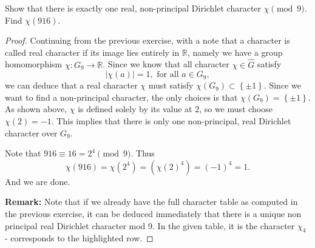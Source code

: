 \documentclass[11pt,letterpaper]{article}
\DeclareMathOperator{\1}{\mathbbm{1}}
\begin{document}
\begin{exercise}
  Show that there is exactly one real, non-principal Dirichlet character $\chi \pmod 9$. Find $\chi(916)$.
\end{exercise}
\begin{proof}
  Continuing from the previous exercise, with a note that a character is called real character if its image lies entirely in
  $\mathbb{R}$, namely  we have a group homomorphism $\chi\colon G_9 \to \mathbb{R}$. Since we know that all character $\chi \in \hat{G}$ satisfy
  \[|\chi(a)| =1, \text{ for all } a \in G_9,\]
  we can deduce that a real character $\chi$ must satisfy $\chi(G_9) \subset \left\lbrace \pm 1 \right\rbrace$. Since
  we want to find a non-principal character, the only choices is that $\chi(G_9) = \left\lbrace \pm 1\right\rbrace$. As shown
  above, $\chi$ is defined solely by its value at $2$, so we must choose $\chi(2) =-1$. This implies that there is only
  one non-principal, real Dirichlet character over $G_9$.

  Note that $916 \equiv 16 = 2^4 \pmod 9$. Thus
  \[ \chi(916) = \chi (2^4) = (\chi(2)^4) = (-1)^4=1.\]
  And we are done.

  \textbf{Remark:} Note that if we already have the full character table as computed in the previous exercise, it can be deduced immediately that
  there is a unique non principal real Dirichlet character mod 9.  In the given table, it is the character $\chi_4$ - corresponds to the highlighted row.
\end{proof}
\end{document}
